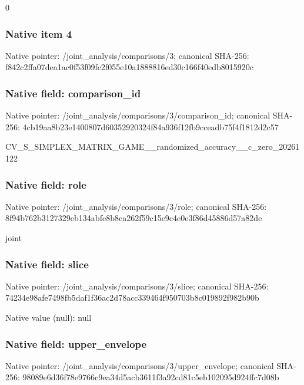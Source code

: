 \documentclass[10pt,a4paper]{article}
\begin{document}
0


\subsubsection{Native item 4}


Native pointer: /joint\_analysis/comparisons/3; canonical SHA-256: f842c2ffa07dea1ac0f53f09\allowbreak{}fc2f055e10a1888816ed30c1\allowbreak{}66f40edb8015920c



\subsubsection{Native field: comparison\_id}


Native pointer: /joint\_analysis/comparis\allowbreak{}ons/3/comparison\_id; canonical SHA-256: 4cb19aa8b23e1400807d6035\allowbreak{}2920324f84a936f12fb9ccea\allowbreak{}db75f4f1812d2c57


CV\_S\_SIMPLEX\_MATRIX\_GAME\allowbreak{}\_\_randomized\_accuracy\_\_c\allowbreak{}\_zero\_20261122


\subsubsection{Native field: role}


Native pointer: /joint\_analysis/comparisons/3/role; canonical SHA-256: 8f94b762b3127329eb134abf\allowbreak{}e8b8ca262f59c15e9c4e0e3f\allowbreak{}86d45886d57a82de


joint


\subsubsection{Native field: slice}


Native pointer: /joint\_analysis/comparisons/3/slice; canonical SHA-256: 74234e98afe7498fb5daf1f3\allowbreak{}6ac2d78acc339464f950703b\allowbreak{}8c019892f982b90b



Native value (null): null



\subsubsection{Native field: upper\_envelope}


Native pointer: /joint\_analysis/comparis\allowbreak{}ons/3/upper\_envelope; canonical SHA-256: 98089e6d36f78e9766c9ea34\allowbreak{}d5acb3611f3a92cd81c5eb10\allowbreak{}2095d924ffc7d08b
\end{document}
